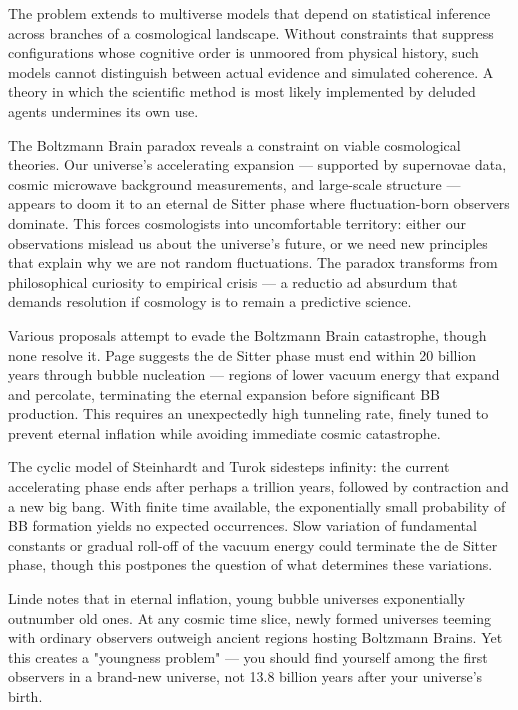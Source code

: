 The problem extends to multiverse models that depend on statistical inference across branches of a cosmological landscape. Without constraints that suppress configurations whose cognitive order is unmoored from physical history, such models cannot distinguish between actual evidence and simulated coherence. A theory in which the scientific method is most likely implemented by deluded agents undermines its own use.

The Boltzmann Brain paradox reveals a constraint on viable cosmological theories. Our universe's accelerating expansion — supported by supernovae data, cosmic microwave background measurements, and large-scale structure — appears to doom it to an eternal de Sitter phase where fluctuation-born observers dominate. This forces cosmologists into uncomfortable territory: either our observations mislead us about the universe's future, or we need new principles that explain why we are not random fluctuations. The paradox transforms from philosophical curiosity to empirical crisis — a reductio ad absurdum that demands resolution if cosmology is to remain a predictive science.

Various proposals attempt to evade the Boltzmann Brain catastrophe, though none resolve it. Page suggests the de Sitter phase must end within 20 billion years through bubble nucleation — regions of lower vacuum energy that expand and percolate, terminating the eternal expansion before significant BB production. This requires an unexpectedly high tunneling rate, finely tuned to prevent eternal inflation while avoiding immediate cosmic catastrophe.

The cyclic model of Steinhardt and Turok sidesteps infinity: the current accelerating phase ends after perhaps a trillion years, followed by contraction and a new big bang. With finite time available, the exponentially small probability of BB formation yields no expected occurrences. Slow variation of fundamental constants or gradual roll-off of the vacuum energy could terminate the de Sitter phase, though this postpones the question of what determines these variations.

Linde notes that in eternal inflation, young bubble universes exponentially outnumber old ones. At any cosmic time slice, newly formed universes teeming with ordinary observers outweigh ancient regions hosting Boltzmann Brains. Yet this creates a "youngness problem" — you should find yourself among the first observers in a brand-new universe, not 13.8 billion years after your universe's birth.

